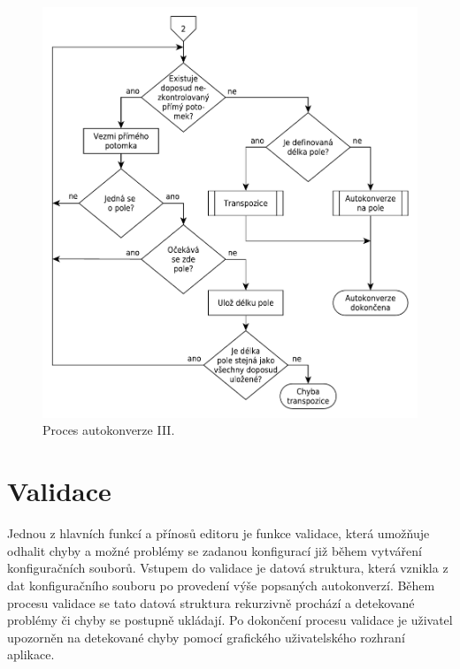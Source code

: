 \documentclass[FM,bw,DP]{tulthesis}
\begin{document}
\begin{figure}[h]
	\centering
    \includegraphics[width=\textwidth]{../img/autoconversion_process_3.pdf}
    \caption{Proces autokonverze III.}
	\label{img:autoconversion_process_3}
\end{figure}


\clearpage

\section{Validace}

Jednou z hlavních funkcí a přínosů editoru je funkce validace, která umožňuje odhalit chyby a možné problémy se zadanou konfigurací již během vytváření konfiguračních souborů. Vstupem do validace je datová struktura, která vznikla z dat konfiguračního souboru po provedení výše popsaných autokonverzí. Během procesu validace se tato datová struktura rekurzivně prochází a detekované problémy či chyby se postupně ukládají. Po dokončení procesu validace je uživatel upozorněn na detekované chyby pomocí grafického uživatelského rozhraní aplikace.
\end{document}
